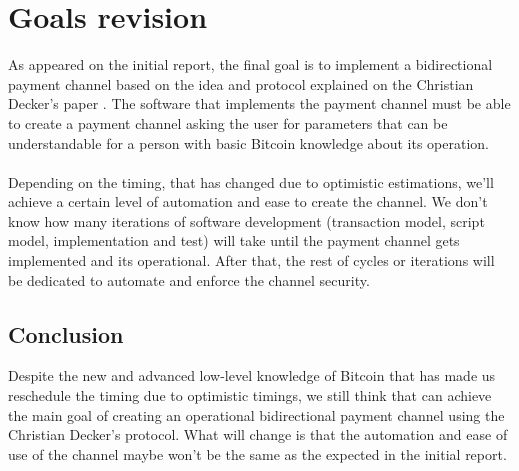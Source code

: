 \chapter*{Goals revision}
\label{chap:goals-revision}
As appeared on the initial report, the final goal is to implement a bidirectional payment channel based on the idea and protocol explained on the Christian Decker's paper \cite{decker2015fast}. The software that implements the payment channel must be able to create a payment channel asking the user for parameters that can be understandable for a person with basic Bitcoin knowledge about its operation.\\\\
Depending on the timing, that has changed due to optimistic estimations, we'll achieve a certain level of automation and ease to create the channel. We don't know how many iterations of software development (transaction model, script model, implementation and test) will take until the payment channel gets implemented and its operational. After that, the rest of cycles or iterations will be dedicated to automate and enforce the channel security. 

\section{Conclusion}
Despite the new and advanced low-level knowledge of Bitcoin that has made us reschedule the timing due to optimistic timings, we still think that can achieve the main goal of creating an operational bidirectional payment channel using the Christian Decker's protocol. What will change is that the automation and ease of use of the channel maybe won't be the same as the expected in the initial report.